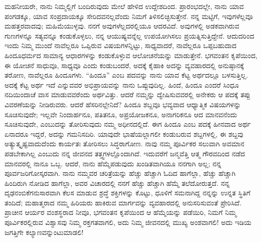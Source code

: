 ಮಹನೀಯರೇ, ನಾನು ನಿಮ್ಮಲ್ಲಿಗೆ ಬಂದಿರುವುದು ಮೇಲೆ ಹೇಳಿದ ಉದ್ದೇಶದಿಂದ. ಪ್ರಾರಂಭದಲ್ಲೇ, ನಾನು ಯಾವ ಪಂಗಡಕ್ಕೂ, ಯಾವ ಸಂಪ್ರದಾಯಕ್ಕೂ ಸೇರಿದವನಲ್ಲವೆಂದು ನಿಮಗೆ ತಿಳಿಸಲಿಚ್ಛಿಸುತ್ತೇನೆ. ನನ್ನ ಮಟ್ಟಿಗೆ, ಇವುಗಳೆಲ್ಲವೂ ಮಹತ್ತರವಾದವು; ಮಹಿಮೆಯುಳ್ಳವು. ನನಗೆ ಅವುಗಳೆಲ್ಲದರಲ್ಲಿಯೂ ಆದರವಿದೆ. ಅವುಗಳಲ್ಲಿ ಅಡಕವಾಗಿರುವ ಗುಣಗಳನ್ನೂ ಸತ್ಯವನ್ನೂ ಕಂಡುಕೊಳ್ಳಲು, ನನ್ನ ಆಯುಷ್ಯವನ್ನೆಲ್ಲ ಉಪಯೋಗಿಸಲು ಪ್ರಯತ್ನಿಸುತ್ತಿದ್ದೇನೆ. ಆದುದರಿಂದ ಇಂದು ನಿಮ್ಮ ಮುಂದೆ ನಾವೆಲ್ಲರೂ ಒಪ್ಪಿರುವ ವಿಷಯಗಳನ್ನಿಟ್ಟು, ಸಾಧ್ಯವಾದರೆ, ನಾವೆಲ್ಲರೂ ಒಪ್ಪಬಹುದಾದ ಹಿಂದೂಧರ್ಮದ ಸಾಮಾನ್ಯ ಆಧಾರಗಳನ್ನು ಕಂಡುಕೊಳ್ಳುವ ಆಲೋಚನೆಯನ್ನು ಮಾಡುತ್ತೇನೆ. ಭಗವಂತನ ಕೃಪೆಯಿಂದ, ಈ ಯೋಚನೆ ಸಾಧುವೂ, ಸಾಧ್ಯವೂ ಎಂದು ಕಂಡುಬಂದರೆ, ಅದಕ್ಕೆ ಕೈಹಾಕಿ ಅದನ್ನು ವ್ಯವಹಾರದಲ್ಲಿ ಅನುಷ್ಠಾನಕ್ಕೆ ತರೋಣ, ನಾವೆಲ್ಲರೂ ಹಿಂದೂಗಳು. “ಹಿಂದೂ” ಎಂಬ ಪದವನ್ನು ನಾನು ಯಾವ ಕೆಟ್ಟ ಅರ್ಥದಲ್ಲೂ ಬಳಸುತ್ತಿಲ್ಲ. ಅದಕ್ಕೆ ಕೆಟ್ಟ ಅರ್ಥ ಇದೆ ಎನ್ನುವವರ ಅಭಿಪ್ರಾಯವನ್ನು ನಾನು ಒಪ್ಪುವುದಿಲ್ಲ. ಹಿಂದೆ, ಹಿಂದೂ ಎಂದರೆ ಸಿಂಧೂ ನದಿಯಿಂದಾಚೆ ವಾಸ ಮಾಡುವವರೆಂದು ಅರ್ಥವಿತ್ತು. ಆದರೆ ನಮ್ಮನ್ನು ದ್ವೇಷಿಸುವವರಲ್ಲಿ ಅನೇಕರು ಆ ಪದಕ್ಕೆ ತಪ್ಪು ವಿವರಣೆಯನ್ನು ನೀಡಿರುವರು. ಆದರೆ ಹೆಸರಿನಲ್ಲೇನಿದೆ? ಹಿಂದೂ ಶಬ್ದವೂ ಭವ್ಯವಾದ ಆಧ್ಯಾತ್ಮಿಕ ವಿಷಯಗಳನ್ನು ಸೂಚಿಸುವುದೇ; ಇಲ್ಲವೇ ನಿಂದಾರ್ಹನೂ, ಪತಿತನೂ, ಅಪ್ರಯೋಜಕನೂ, ಅನಾಗರಿಕನೂ ಆದ ಮಾನವನೆಂದು ಸೂಚಿಸುವುದೇ, ಎಂಬುದನ್ನು ತೋರಿಸುವುದು ನಮ್ಮ ಅಧೀನದಲ್ಲಿದೆ. ಈಗ ಹಿಂದೂ ಎಂಬ ಪದಕ್ಕೆ ಹೀನವಾದ ಅರ್ಥ ಏನಾದರೂ ಇದ್ದರೆ, ಅದನ್ನು ಗಮನಿಸದಿರಿ. ಯಾವುದೇ ಭಾಷೆಯಲ್ಲಾಗಲೀ ಕಂಡುಬರುವ ಶಬ್ದಗಳಲ್ಲಿ, ಈ ಶಬ್ದವು ಅತ್ಯುತ್ಕೃಷ್ಟವಾದುದೆಂದು ಕಾರ್ಯತಃ ತೋರಿಸಲು ಸಿದ್ಧರಾಗೋಣ. ನಾವು ನಮ್ಮ ಪೂರ್ವಿಕರ ಸಲುವಾಗಿ ಅವಮಾನ ಪಡಬೇಕಾಗಿಲ್ಲ ಎಂಬುದು ನನ್ನ ಜೀವನದ ತತ್ತ್ವಗಳಲ್ಲೊಂದಾಗಿದೆ. ಇದುವರೆಗೆ ಜನ್ಮವೆತ್ತಿ ಆತ್ಮ ಗೌರವದಿಂದ ನಡೆದ ಮಾನವರಲ್ಲಿ ನಾನೂ ಒಬ್ಬ. ಆದರೆ, ನಾನು ಹೆಮ್ಮೆಪಡುವುದು ಖಂಡಿತವಾಗಿಯೂ ನನಗಾಗಿ ಅಲ್ಲ; ನನ್ನ ಪೂರ್ವಜರಿಗೋಸ್ಕರವಾಗಿ. ನಾನು ನಮ್ಮವರ ಚರಿತ್ರೆಯನ್ನು ಹೆಚ್ಚು ಹೆಚ್ಚಾಗಿ ಓದಿದ ಹಾಗೆಲ್ಲಾ, ಹೆಚ್ಚು ಹೆಚ್ಚಾಗಿ ಹಿಂದಿರುಗಿ ನೋಡಿದ ಹಾಗೆಲ್ಲಾ, ಅವರ ವಿಚಾರದಲ್ಲಿ ನನಗೆ ಹೆಚ್ಚು ಹೆಚ್ಚಾಗಿ ಹೆಮ್ಮೆ ತಲೆದೋರುತ್ತದೆ. ನನ್ನ ದೃಢನಂಬಿಕೆಗನುಸಾರವಾಗಿ ಕೆಲಸ ಮಾಡುವ ಶ್ರದ್ಧೆ ಶಕ್ತಿಗಳನ್ನು ಕೊಟ್ಟು, ಧೂಳಿಗೆ ಸಮನಾಗಿದ್ದ ನನ್ನನ್ನು ಉನ್ನತ ಸ್ಥಿತಿಗೆ ತಂದಿದೆ; ಮಹಾತ್ಮರಾದ ನಮ್ಮ ಹಿರಿಯರು ಹಾಕಿರುವ ಮಾರ್ಗವನ್ನು ವ್ಯವಹಾರದಲ್ಲಿ ಅನುಸರಿಸುವಂತೆ ಪ್ರೇರಿಸಿದೆ. ಪ್ರಾಚೀನ ಆರ್ಯರ ವಂಶಸ್ಥರಾದ ನೀವೂ, ಭಗವಂತನ ಕೃಪೆಯಿಂದ ಆ ಹೆಮ್ಮೆಯನ್ನು ಪಡೆಯಿರಿ, ನಿಮಗೆ ನಿಮ್ಮ ಪೂರ್ವಿಕರಲ್ಲಿರುವ ವಿಶ್ವಾಸವು ನಿಮ್ಮ ರಕ್ತಗತವಾಗಲಿ, ಅದು ನಿಮ್ಮ ಜೀವನದಲ್ಲಿ ಮುಖ್ಯ ಅಂಶವಾಗಲಿ! ಅದು ಇಡಿಯ ಜಗತ್ತಿಗೇ ಕಲ್ಯಾಣವನ್ನುಂಟುಮಾಡಲಿ!

